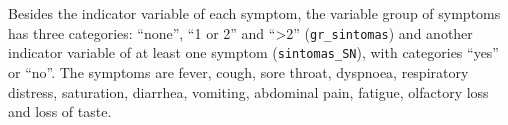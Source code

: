 \documentclass[
]{article}
\newenvironment{Shaded}{\begin{snugshade}}{\end{snugshade}}
\newcommand{\CommentTok}[1]{\textcolor[rgb]{0.56,0.35,0.01}{\textit{#1}}}
\newcommand{\DataTypeTok}[1]{\textcolor[rgb]{0.13,0.29,0.53}{#1}}
\newcommand{\KeywordTok}[1]{\textcolor[rgb]{0.13,0.29,0.53}{\textbf{#1}}}
\newcommand{\NormalTok}[1]{#1}
\newcommand{\OperatorTok}[1]{\textcolor[rgb]{0.81,0.36,0.00}{\textbf{#1}}}
\newcommand{\StringTok}[1]{\textcolor[rgb]{0.31,0.60,0.02}{#1}}
\begin{document}
\begin{Shaded}
\end{Shaded}

\begin{Shaded}
\end{Shaded}

\begin{Shaded}
\end{Shaded}

Besides the indicator variable of each symptom, the variable group of
symptoms has three categories: ``none'', ``1 or 2'' and
``\textgreater2'' (\texttt{gr\_sintomas}) and another indicator variable
of at least one symptom (\texttt{sintomas\_SN}), with categories ``yes''
or ``no''. The symptoms are fever, cough, sore throat, dyspnoea,
respiratory distress, saturation, diarrhea, vomiting, abdominal pain,
fatigue, olfactory loss and loss of taste.
\end{document}

